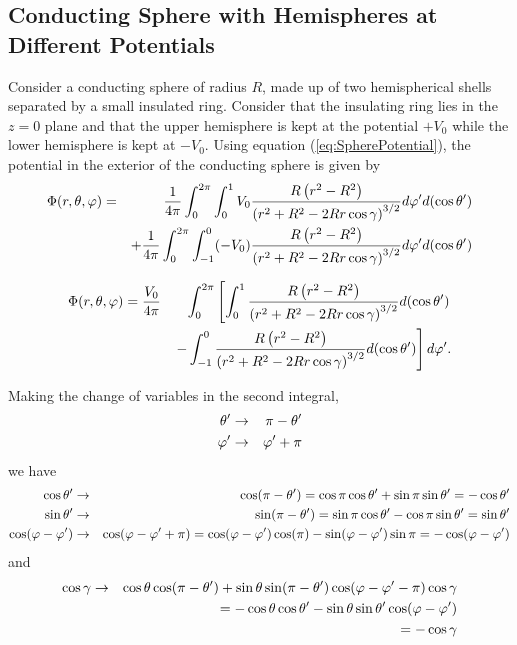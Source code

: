 \subsection{ Conducting Sphere with Hemispheres at Different Potentials}
Consider a conducting sphere  of radius $R$, made up of two hemispherical shells separated by a small insulated ring. Consider that the insulating ring lies in the $z=0$ plane and that the upper hemisphere is kept at the potential $+ V_0$ while the lower hemisphere is kept at $- V_0$. Using equation (\ref{eq:SpherePotential}), the potential in the exterior of the conducting sphere is given by
\begin{eqnarray}
\Phi (r, \theta, \varphi ) &=& \frac{1}{4 \pi} \int_0^{2\pi} \int_0^1 V_0  \frac{ R \left(  r^2- R^2 \right) }{  \left( r^2+ R^2- 2 Rr \cos \gamma \right)^{3/2} } d \varphi ' d(\cos \theta ')\notag \\ 
& &+ \frac{1}{4 \pi} \int_0^{2\pi} \int_{-1}^0 (- V_0)  \frac{R \left(  r^2- R^2 \right) }{  \left( r^2+ R^2- 2 Rr \cos \gamma \right)^{3/2} } d \varphi ' d(\cos \theta ') \notag
\end{eqnarray}

\begin{eqnarray}
\Phi (r, \theta, \varphi ) &= \frac{V_0}{4 \pi}   & \int_0^{2\pi}  \left[ \int_0^1  \frac{ R \left(  r^2- R^2 \right) }{  \left( r^2+ R^2- 2 Rr \cos \gamma \right)^{3/2} } d(\cos \theta ')\right. \notag \\ 
& & \left. -\int_{-1}^0   \frac{ R \left(  r^2- R^2 \right) }{  \left( r^2+ R^2- 2 Rr \cos \gamma \right)^{3/2} }  d(\cos \theta ') \right] d \varphi ' \notag .
\end{eqnarray}

Making the change of variables in the second integral,
\begin{eqnarray}
\theta ' & \rightarrow & \pi - \theta ' \notag \\
\varphi ' & \rightarrow &  \varphi ' + \pi \notag
\end{eqnarray}
we have
\begin{eqnarray}
\cos \theta ' & \rightarrow & \cos (\pi - \theta ') = \cos \pi \cos \theta ' + \sin \pi \sin \theta' = -\cos \theta ' \notag \\
\sin \theta ' & \rightarrow & \sin (\pi - \theta ') = \sin \pi \cos \theta ' - \cos \pi \sin \theta' =  \sin \theta ' \notag \\
 \cos (\varphi - \varphi ' ) & \rightarrow &  \cos (\varphi - \varphi ' + \pi) = \cos (\varphi - \varphi ' ) \cos (\pi) - \sin (\varphi - \varphi ' ) \sin \pi = -\cos (\varphi - \varphi ' ) \notag
\end{eqnarray}
and
\begin{eqnarray}
\cos \gamma & \rightarrow & \cos \theta \cos (\pi -\theta ') + \sin \theta  \sin (\pi -\theta ' ) \cos (\varphi - \varphi ' - \pi)
\cos \gamma \notag \\
& & = - \cos \theta \cos \theta ' - \sin \theta  \sin \theta ' \cos (\varphi - \varphi ') \notag \\
&& = - \cos \gamma \notag
\end{eqnarray}

